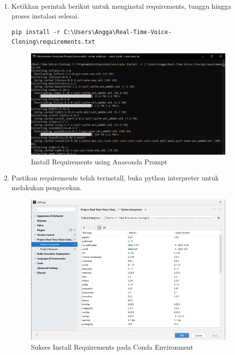 \begin{enumerate}
\item Ketikkan perintah berikut untuk menginstal requirements, tunggu hingga proses instalasi selesai.
\begin{lstlisting}
pip install -r C:\Users\Angga\Real-Time-Voice-Cloning\requirements.txt
\end{lstlisting}

\begin{figure}[H]
\centering
\includegraphics[scale=.4]{figures/req6}
\caption{Install Requirements using Anaconda Prompt}
\label{req6}
\end{figure}

\item Pastikan requirements telah terinstall, buka python interpreter untuk melakukan pengecekan.

\begin{figure}[H]
\centering
\includegraphics[scale=.4]{figures/req7}
\caption{Sukses Install Requirements pada Conda Environment}
\label{req7}
\end{figure}


\end{enumerate}
